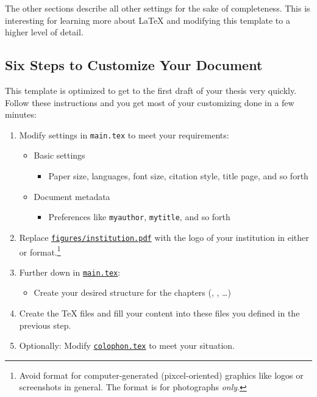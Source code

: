 The other sections describe all other settings for the sake of completeness. This is
interesting for learning more about \LaTeX{} and modifying this template to a higher level of detail.


\newpage
\subsection{Six Steps to Customize Your Document}\myimportant
\label{sec:modifytemplate}

This template is optimized to get to the first draft of your thesis
very quickly. Follow these instructions and you get most of your
customizing done in a few minutes:

\newcommand{\myfile}[1]{\texttt{\href{file:#1}{#1}}}

\begin{enumerate}
\item Modify settings in \texttt{main.tex} to meet your requirements:
  \begin{itemize}
  \item Basic settings
    \begin{itemize}
    \item Paper size, languages, font size, citation style,
          title page, and so forth
    \end{itemize}
  \item Document metadata
    \begin{itemize}
    \item Preferences like \verb+myauthor+, \verb+mytitle+, and so forth
    \end{itemize}
  \end{itemize}
\item Replace \myfile{figures/institution.pdf} with the logo of
your institution in either  or 
format.\footnote{Avoid  format for
computer-generated (pixcel-oriented) graphics like logos or
screenshots in general. The  format is for
photographs \emph{only}.}
\item Further down in \myfile{main.tex}:
  \begin{itemize}
  \item Create your desired structure for the chapters
        (\verb++, \verb++, \ldots)
  \end{itemize}
\item Create the \TeX{} files and fill your content into these files you defined in the previous step.
\item Optionally: Modify \myfile{colophon.tex} to meet your situation.

\end{enumerate}
